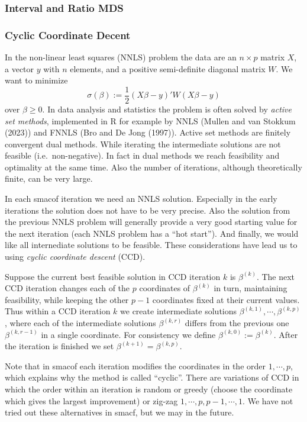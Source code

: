 \documentclass[
  12pt,
]{article}
\begin{document}
\subsubsection{Interval and Ratio MDS}\label{interval-and-ratio-mds}

\subsubsection{Cyclic Coordinate Decent}\label{cyclic-coordinate-decent}

In the non-linear least squares (NNLS) problem the data are an \(n\times p\) matrix
\(X\), a vector \(y\) with \(n\) elements, and a positive semi-definite diagonal matrix
\(W\). We want to minimize
\[
\sigma(\beta):=\frac12(X\beta-y)'W(X\beta-y)
\]
over \(\beta\geq 0\). In data analysis and statistics the problem is often solved by
\emph{active set methods}, implemented in R for example by NNLS (Mullen and van Stokkum (2023)) and FNNLS (Bro and De Jong (1997)). Active set methods are finitely convergent dual methods. While iterating the intermediate solutions are not feasible (i.e.~non-negative). In fact
in dual methods we reach feasibility and optimality at the same time. Also the number of iterations, although theoretically finite, can be very large.

In each smacof iteration we need an NNLS solution. Especially in the early iterations the solution does not have to be very precise. Also the solution from the previous
NNLS problem will generally provide a very good starting value for the next iteration
(each NNLS problem has a ``hot start''). And finally, we would like all internediate solutions to be feasible. These considerations have lead us to using
\emph{cyclic coordinate descent} (CCD).

Suppose the current best feasible solution in CCD iteration \(k\) is \(\beta^{(k)}\).
The next CCD iteration changes each of the \(p\) coordinates of \(\beta^{(k)}\) in turn, maintaining feasibility, while keeping the other \(p-1\) coordinates fixed at their current values. Thus within a CCD iteration \(k\) we create intermediate solutions \(\beta^{(k,1)},\cdots,\beta^{(k,p)}\), where each of the intermediate solutions \(\beta^{(k,r)}\) differs from the previous one \(\beta^{(k,r-1)}\) in a single coordinate.
For consistency we define \(\beta^{(k,0)}:=\beta^{(k)}\). After the iteration is finished
we set \(\beta^{(k+1)}=\beta^{(k,p)}\).

Note that in smacof each iteration modifies the coordinates in the order \(1,\cdots,p\), which explains why the method is called ``cyclic''. There are variations of CCD in which the order within an iteration is random or greedy (choose the coordinate which gives the largest improvement) or zig-zag \(1,\cdots,p,p-1,\cdots,1\). We have not tried out these alternatives in smacf, but we may in the future.
\end{document}
